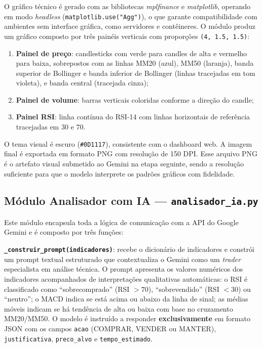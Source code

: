 \documentclass[conference]{IEEEtran}
\begin{document}
O gráfico técnico é gerado com as bibliotecas \textit{mplfinance} e \textit{matplotlib}, operando em modo \textit{headless} (\texttt{matplotlib.use("Agg")}), o que garante compatibilidade com ambientes sem interface gráfica, como servidores e contêineres. O módulo produz um gráfico composto por três painéis verticais com proporções \texttt{(4, 1.5, 1.5)}:

\begin{enumerate}
  \item \textbf{Painel de preço}: candlesticks com verde para candles de alta e vermelho para baixa, sobrepostos com as linhas MM20 (azul), MM50 (laranja), banda superior de Bollinger e banda inferior de Bollinger (linhas tracejadas em tom violeta), e banda central (tracejada cinza);
  \item \textbf{Painel de volume}: barras verticais coloridas conforme a direção do candle;
  \item \textbf{Painel RSI}: linha contínua do RSI-14 com linhas horizontais de referência tracejadas em 30 e 70.
\end{enumerate}

O tema visual é escuro (\texttt{\#0D1117}), consistente com o dashboard web. A imagem final é exportada em formato PNG com resolução de 150 DPI. Esse arquivo PNG é o artefato visual submetido ao Gemini na etapa seguinte, sendo a resolução suficiente para que o modelo interprete os padrões gráficos com fidelidade.

\subsection{Módulo Analisador com IA — \texttt{analisador\_ia.py}}

Este módulo encapsula toda a lógica de comunicação com a API do Google Gemini e é composto por três funções:

\textbf{\texttt{\_construir\_prompt(indicadores)}}: recebe o dicionário de indicadores e constrói um prompt textual estruturado que contextualiza o Gemini como um \textit{trader} especialista em análise técnica. O prompt apresenta os valores numéricos dos indicadores acompanhados de interpretações qualitativas automáticas: o RSI é classificado como ``sobrecomprado'' (RSI $> 70$), ``sobrevendido'' (RSI $< 30$) ou ``neutro''; o MACD indica se está acima ou abaixo da linha de sinal; as médias móveis indicam se há tendência de alta ou baixa com base no cruzamento MM20/MM50. O modelo é instruído a responder \textbf{exclusivamente} em formato JSON com os campos \texttt{acao} (COMPRAR, VENDER ou MANTER), \texttt{justificativa}, \texttt{preco\_alvo} e \texttt{tempo\_estimado}.
\end{document}
